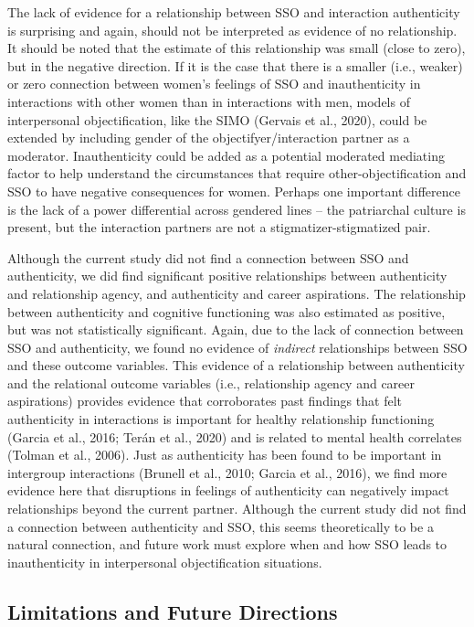 \documentclass[man]{apa6}
\begin{document}
The lack of evidence for a relationship between SSO and interaction
authenticity is surprising and again, should not be interpreted as
evidence of no relationship. It should be noted that the estimate of
this relationship was small (close to zero), but in the negative
direction. If it is the case that there is a smaller (i.e., weaker) or
zero connection between women's feelings of SSO and inauthenticity in
interactions with other women than in interactions with men, models of
interpersonal objectification, like the SIMO (Gervais et al., 2020),
could be extended by including gender of the objectifyer/interaction
partner as a moderator. Inauthenticity could be added as a potential
moderated mediating factor to help understand the circumstances that
require other-objectification and SSO to have negative consequences for
women. Perhaps one important difference is the lack of a power
differential across gendered lines -- the patriarchal culture is
present, but the interaction partners are not a stigmatizer-stigmatized
pair.

Although the current study did not find a connection between SSO and
authenticity, we did find significant positive relationships between
authenticity and relationship agency, and authenticity and career
aspirations. The relationship between authenticity and cognitive
functioning was also estimated as positive, but was not statistically
significant. Again, due to the lack of connection between SSO and
authenticity, we found no evidence of \emph{indirect} relationships
between SSO and these outcome variables. This evidence of a relationship
between authenticity and the relational outcome variables (i.e.,
relationship agency and career aspirations) provides evidence that
corroborates past findings that felt authenticity in interactions is
important for healthy relationship functioning (Garcia et al., 2016;
Terán et al., 2020) and is related to mental health correlates (Tolman
et al., 2006). Just as authenticity has been found to be important in
intergroup interactions (Brunell et al., 2010; Garcia et al., 2016), we
find more evidence here that disruptions in feelings of authenticity can
negatively impact relationships beyond the current partner. Although the
current study did not find a connection between authenticity and SSO,
this seems theoretically to be a natural connection, and future work
must explore when and how SSO leads to inauthenticity in interpersonal
objectification situations.

\subsection{Limitations and Future
Directions}\label{limitations-and-future-directions}
\end{document}

